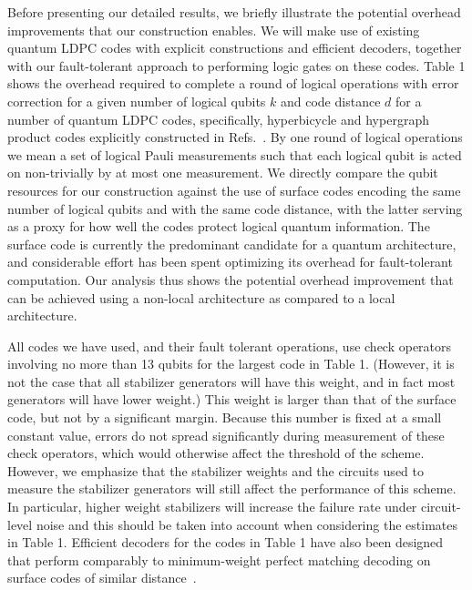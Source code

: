 \documentclass[reprint,
superscriptaddress,
 amsmath,amssymb,
 aps, longbibliography
]{revtex4-1}
\newcommand{\rev}[1]{{#1}}
\begin{document}

Before presenting our detailed results, we briefly illustrate the potential overhead improvements that our construction enables.  We will make use of existing quantum LDPC codes with explicit constructions and efficient decoders, together with our fault-tolerant approach to performing logic gates on these codes. Table 1 shows the overhead required to complete a round of logical operations with error correction for a given number of logical qubits $k$ and code distance $d$ for a number of quantum LDPC codes, specifically, hyperbicycle and hypergraph product codes explicitly constructed in Refs.~\cite{Panteleev19,Kovalev2013}. \rev{By one round of logical operations we mean a set of logical Pauli measurements such that each logical qubit is acted on non-trivially by at most one measurement.}
We directly compare the qubit resources for our construction against the use of surface codes encoding the same number of logical qubits and with the same code distance, with the latter serving as a proxy for how well the codes protect logical quantum information. The surface code is currently the predominant candidate for a quantum architecture, and considerable effort has been spent optimizing its overhead for fault-tolerant computation. Our analysis thus shows the potential overhead improvement that can be achieved using a non-local architecture as compared to a local architecture.

All codes we have used, and their fault tolerant operations, use check operators involving no more than 13 \rev{qubits for the largest code in Table 1. (However, it is not the case that all stabilizer generators will have this weight, and in fact most generators will have lower weight.)} This weight is larger than that of the surface code, but not by a significant margin. Because this number is fixed at a small constant value, errors do not spread significantly during measurement of these check operators, which would otherwise affect the threshold of the scheme. \rev{However, we emphasize that the stabilizer weights and the circuits used to measure the stabilizer generators will still affect the performance of this scheme. In particular, higher weight stabilizers will increase the failure rate under circuit-level noise and this should be taken into account when considering the estimates in Table 1}. Efficient decoders for \rev{the codes in Table 1} have also been designed that perform comparably to minimum-weight perfect matching decoding on surface codes of similar distance~\cite{Panteleev19}.
\end{document}

